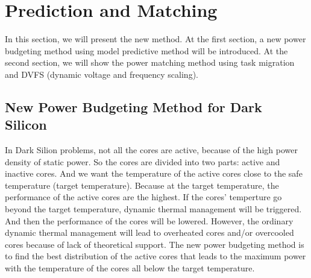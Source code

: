 \section{Prediction and Matching }
In this section, we will present the new method. At the first section, a new power budgeting method using model predictive method \cite{Wang:MPC_BOOK'09} will be introduced. At the second section, we will show the power matching method using task migration and DVFS \cite{MaWang:APCCAS'14}(dynamic voltage and frequency scaling). 
\subsection{New Power Budgeting Method for Dark Silicon}
In Dark Silion problems, not all the cores are active, because of the high power density of static power. So the cores are divided into two parts: active and inactive cores. And we want the temperature of the active cores close to the safe temperature (target temperature). Because at the target temperature, the performance of the active cores are the highest. If the cores' temperture go beyond the target temperature, dynamic thermal management will be triggered. And then the performance of the cores will be lowered. However, the ordinary dynamic thermal management will lead to overheated cores and/or overcooled cores because of lack of theoretical support. The new power budgeting method is to find the best distribution of the active cores that leads to the maximum power with the temperature of the cores all below the target temperature.

